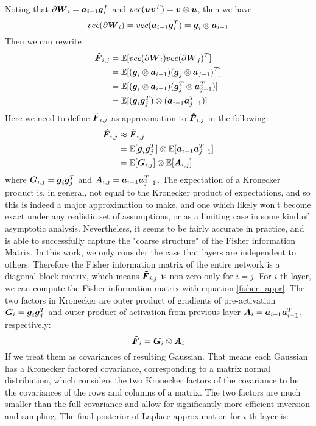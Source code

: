 Noting that $\partial \boldsymbol W_i = \boldsymbol a_{i-1}\boldsymbol g_i^T$ and $vec(\boldsymbol u \boldsymbol v^T) = \boldsymbol v \otimes \boldsymbol u$, then we have 
\[
vec(\partial \boldsymbol W_i) = vec(\boldsymbol a_{i-1}\boldsymbol g_{i}^T) = \boldsymbol g_i \otimes \boldsymbol a_{i-1}
\]
Then we can rewrite 
\[
\begin{aligned}
\boldsymbol{\hat F}_{i,j} &=  \mathbb E[vec(\partial\boldsymbol W_i)vec(\partial\boldsymbol W_j)^T]\\
&=\mathbb E[(\boldsymbol g_i \otimes \boldsymbol a_{i-1})(\boldsymbol g_j \otimes \boldsymbol a_{j-1})^T]\\
&=\mathbb E[(\boldsymbol g_i \otimes \boldsymbol a_{i-1})(\boldsymbol g_j^T \otimes \boldsymbol a_{j-1}^T)]\\
&=\mathbb E[(\boldsymbol g_i \boldsymbol g_j^T)\otimes(\boldsymbol a_{i-1}  \boldsymbol a_{j-1}^T)]
\end{aligned}
\]
Here we need to define $\boldsymbol{\tilde{F}}_{i,j}$ as approximation to $\boldsymbol{\hat F}_{i,j}$ in the following:
\begin{equation}
\begin{aligned}\label{fisher_appr}
\boldsymbol{\hat F}_{i,j} &\approx \boldsymbol{\tilde{F}}_{i,j} \\
&=\mathbb E[\boldsymbol g_i \boldsymbol g_j^T] \otimes \mathbb E[\boldsymbol a_{i-1} \boldsymbol a_{j-1}^T] \\
&= \mathbb E[\boldsymbol G_{i,j}] \otimes \mathbb E[\boldsymbol A_{i,j}]
\end{aligned}
\end{equation}
where $\boldsymbol G_{i,j} = \boldsymbol g_i \boldsymbol g_j^T$ and $\boldsymbol A_{i,j} = \boldsymbol a_{i-1}\boldsymbol a_{j-1}^T$. The expectation of a Kronecker product is, in general, not equal to the Kronecker product of expectations, and so this
is indeed a major approximation to make, and one which likely won't become exact under any realistic set of assumptions, or as a limiting case in some kind of asymptotic analysis. Nevertheless, it seems to be fairly accurate in practice, and is able to successfully capture the "coarse structure" of the Fisher information Matrix. 
In this work, we only consider the case that layers are independent to others. Therefore the Fisher information matrix of the entire network is a diagonal block matrix, which means $\boldsymbol{\tilde{F}}_{i,j}$ is non-zero only for $i=j$. For $i$-th layer, we can compute the Fisher information matrix with equation \ref{fisher_appr}. The two factors in Kronecker are outer product of gradients of pre-activation $\boldsymbol G_i = \boldsymbol g_i \boldsymbol g_j^T$ and outer product of activation from previous layer $\boldsymbol A_{i} = \boldsymbol a_{i-1}\boldsymbol a_{i-1}^T$, respectively:
\[
\boldsymbol{\tilde{F}}_{i} = \boldsymbol G_i \otimes \boldsymbol A_i
\] 
If we treat them as covariances of resulting Gaussian. That means each Gaussian has a Kronecker factored covariance, corresponding to a matrix normal distribution\cite{gupta1999matrix}, which considers the two Kronecker factors of the covariance to be the covariances of the rows and columns of a matrix. The two factors are much smaller than the full covariance and allow for significantly more efficient inversion and sampling. The final posterior of Laplace approximation for $i$-th layer is:
